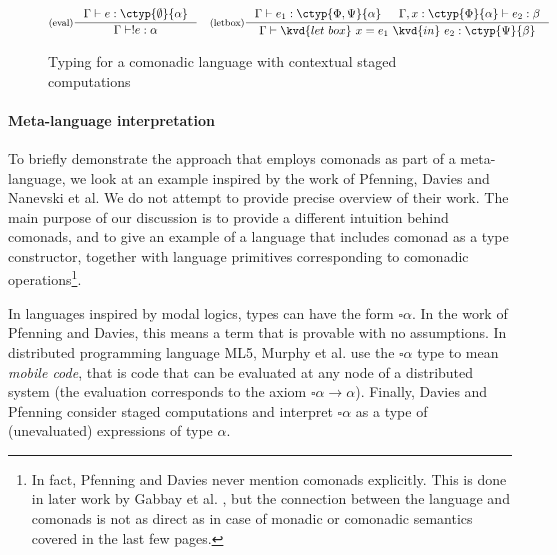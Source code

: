 \begin{figure}
\begin{equation*}
\inference[(eval)]
  {\Gamma \vdash e : \ctyp{\emptyset}{\alpha}}
  {\Gamma \vdash !e : \alpha}
\quad
\inference[(letbox)]
  {\Gamma \vdash e_1 : \ctyp{\Phi, \Psi}{\alpha} & \Gamma, x : \ctyp{\Phi}{\alpha} \vdash e_2 : \beta }
  {\Gamma \vdash \kvd{let~box}~x=e_1~\kvd{in}~e_2 : \ctyp{\Psi}{\beta}}
\end{equation*}

\caption{Typing for a comonadic language with contextual staged computations}
\label{fig:modal-meta}
\end{figure}


\paragraph{Meta-language interpretation} To briefly demonstrate the approach that employs comonads
as part of a meta-language, we look at an example inspired by the work of Pfenning, Davies and 
Nanevski et al. We do not attempt to provide precise overview of their work. The main purpose 
of our discussion is to provide a different intuition behind comonads, and to give an example
of a language that includes comonad as a type constructor, together with language primitives
corresponding to comonadic operations\footnote{In fact, Pfenning and Davies \cite{logic-modal-reconstruction,logic-cmtt}
never mention comonads explicitly. This is done in later work by Gabbay et al. \cite{logic-cmtt-semantics}, 
but the connection between the language and comonads is not as direct as in case of monadic or
comonadic semantics covered in the last few pages.}. 

In languages inspired by modal logics, types can have the form $\square \alpha$. In the work of
Pfenning and Davies, this means a term that is provable with no assumptions. In distributed 
programming language ML5, Murphy et al. \cite{app-distributed-ml5,logic-distributed-calculus} use the 
$\square \alpha$ type to mean \emph{mobile code}, that is code that can be evaluated at any node of a 
distributed system (the evaluation corresponds to the axiom $\square \alpha \rightarrow \alpha$). 
Finally, Davies and Pfenning \cite{logic-modal-staged} consider staged computations and interpret 
$\square \alpha$ as a type of (unevaluated) expressions of type $\alpha$.

